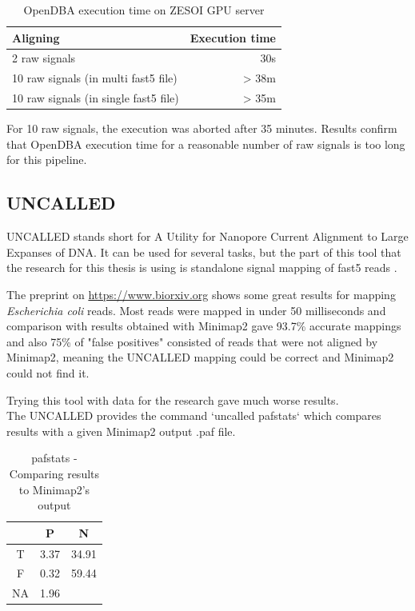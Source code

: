 \documentclass[times, utf8, zavrsni, numeric]{fer}
\begin{document}
\begin{table}[H]
\caption{OpenDBA execution time on ZESOI GPU server}
\label{openDBA2}
\centering
\begin{tabular}{lr}
    \textbf{Aligning} & \textbf{Execution time} \\ \hline
    2 raw signals & 30s \\ \hline
    10 raw signals (in multi fast5 file) & > 38m \\ \hline
    10 raw signals (in single fast5 file) & > 35m \\ \hline
\end{tabular}
\end{table}

For 10 raw signals, the execution was aborted after 35 minutes. 
Results confirm that OpenDBA execution time for a reasonable number of raw signals is too long
for this pipeline. 

\pagebreak

\subsection{UNCALLED}
UNCALLED stands short for A Utility for Nanopore Current Alignment to Large Expanses of DNA.
It can be used for several tasks, but the part of this tool that the research for this thesis 
is using is standalone signal mapping of fast5 reads \cite{uncalled}.

The preprint on \url{https://www.biorxiv.org} shows some great results for mapping \textit{Escherichia coli}
reads. Most reads were mapped in under 50 milliseconds and comparison with results obtained with Minimap2 gave 93.7\% 
accurate mappings and also 75\% of "false positives" consisted of reads that were not aligned by Minimap2, meaning 
the UNCALLED mapping could be correct and Minimap2 could not find it.

Trying this tool with data for the research gave much worse results. \\
The UNCALLED provides the command `uncalled pafstats` which compares results with a given 
Minimap2 output .paf file. 

\begin{table}[H]
    \caption{pafstats - Comparing results to Minimap2's output}
    \centering
    \label{pafstats1}
    {\begin{tabular}{ccc}
        & P & N \\ \hline
      T & 3.37 & 34.91 \\ \hline
      F & 0.32 & 59.44 \\ \hline
      NA & 1.96 & \\ \hline  
    \end{tabular}}
\end{table}
\end{document}
